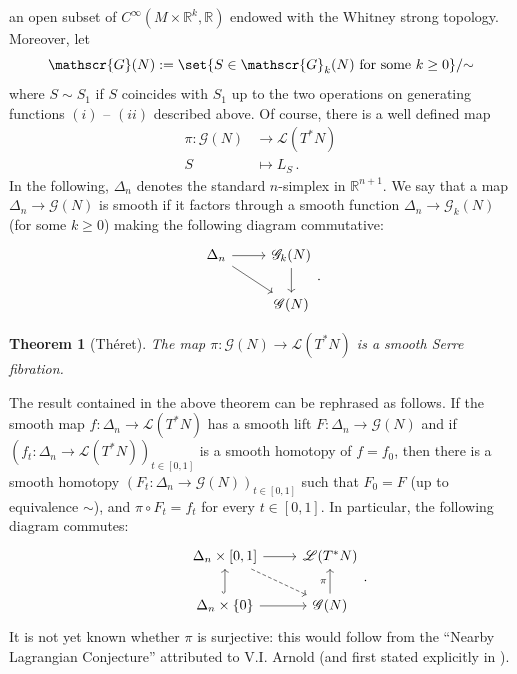 \documentclass{article}
\makeatletter
\newcommand{\1}{\mathbbm{1}}
\newtheorem{thm}{Theorem}[section]
\newcommand*{\@old@slash}{}\let\@old@slash\slash
\def\slash{\relax\ifmmode\delimiter"502F30E\mathopen{}\else\@old@slash\fi}
\theoremstyle{remark}
\makeatother
\begin{document}
{{an open subset of $C^{\infty}(M\times \mathbb{R}^k, \mathbb{R})$ endowed with the Whitney strong topology. Moreover, let
$$\mathscr{G}(N) := \set{ S \in \mathscr{G}_k(N) \text{ for some } k \ge 0} \slash \sim$$
where $S \sim S_1$ if $S$ coincides with $S_1$ up to the two operations on generating functions $(i)$ -- $(ii)$ described above. Of course, there is a well defined map
\begin{equation*}\label{eq:serFib}
\begin{split}
\pi: \mathscr{G}(N) & \rightarrow \mathscr{L}(T^*N) \\
S &\mapsto L_S\, .
\end{split}
\end{equation*}
In the following, $\Delta_n$ denotes the standard $n$-simplex in $\mathbb{R}^{n+1}$. We say that a map $\Delta_n \rightarrow \mathscr{G}(N)$ is smooth if it factors through a smooth function $\Delta_n \rightarrow \mathscr{G}_k(N)$ (for some $k\ge 0$) making the following diagram commutative:
    \begin{equation*}
        \begin{tikzcd}
\Delta_n \arrow[r]\arrow[dr]&\mathscr{G}_k(N)\arrow[d]\\
&\mathscr{G}(N)
\end{tikzcd}.
    \end{equation*}
    
\begin{thm}[Théret]\label{thm:theSerFib}
The map $\pi: \mathscr{G}(N) \rightarrow \mathscr{L}(T^*N)$ is a smooth Serre fibration.
\end{thm}
\noindent The result contained in the above theorem can be rephrased as follows. If the smooth map $f: \Delta_n \to \mathscr{L}(T^*N)$ has a smooth lift $F: \Delta_n \to \mathscr{G}(N)$ and if $(f_t:\Delta_n \to \mathscr{L}(T^*N))_{t \in [0,1]}$ is a smooth homotopy of $f = f_0$, then there is a smooth homotopy $(F_t:\Delta_n \to \mathscr{G}(N))_{t \in [0,1]}$ such that $F_0 = F$ (up to equivalence $\sim$), and $\pi \circ F_t = f_t$ for every $t \in [0,1]$. In particular, the following diagram commutes:
\begin{equation*}
    \begin{tikzcd}
& \Delta_n \times [0,1] \arrow[r] \arrow[dr, dashed] & \mathscr{L}(T^*N) \\
& \Delta_{n} \times \{0\} \arrow[u, hook] \arrow[r] & \mathscr{G}(N) \arrow[u,"\pi"]
\end{tikzcd}.
\end{equation*}
It is not yet known whether $\pi$ is surjective: this would follow from the ``Nearby Lagrangian Conjecture'' attributed to V.I. Arnold (and first stated explicitly in \cite{Lalonde-Sikorav}). \\

}}
\end{document}
